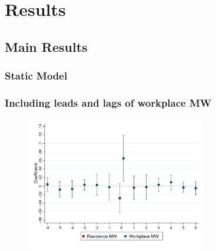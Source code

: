 \documentclass[aspectratio=169, t]{beamer}
\begin{document}
\section{Results}

\subsection{Main Results}

\begin{frame}[label = static_tab]
    \frametitle{Static Model}

    \hyperlink{example_pred_chi_07_2019}{}
\end{frame}

\begin{frame}[label = dyn_baseline_plot]
    \frametitle{Including leads and lags of workplace MW}

    \begin{figure}
        \centering
        \vspace{-2mm}
        \includegraphics[width=0.70\textwidth]{fd_baseline/output/fd_both_mw_wkp_only_dynamic.png}
    \end{figure}
    
\end{frame}
\end{document}
